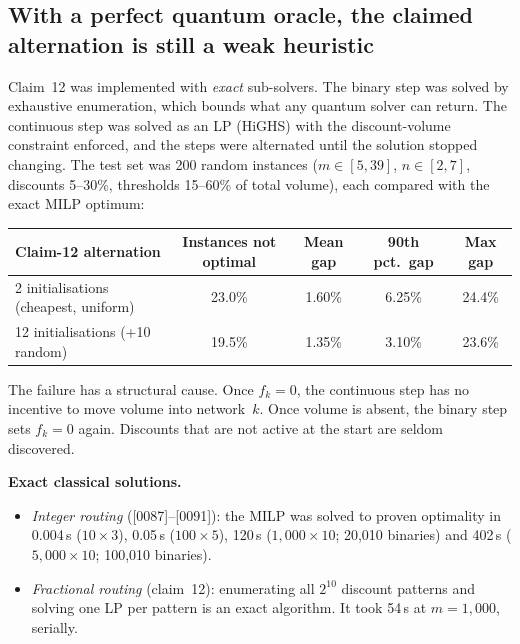 \documentclass[10pt,a4paper]{article}
\begin{document}
\subsection{With a perfect quantum oracle, the claimed alternation is still a weak heuristic}
Claim~12 was implemented with \emph{exact} sub-solvers. The binary step was solved by exhaustive enumeration, which bounds what any quantum solver can return. The continuous step was solved as an LP (HiGHS) with the discount-volume constraint enforced, and the steps were alternated until the solution stopped changing. The test set was 200 random instances ($m\in[5,39]$, $n\in[2,7]$, discounts 5--30\%, thresholds 15--60\% of total volume), each compared with the exact MILP optimum:
\begin{center}
\begin{tabular}{lcccc}
\toprule
Claim-12 alternation & Instances not optimal & Mean gap & 90th pct.\ gap & Max gap \\
\midrule
2 initialisations (cheapest, uniform) & 23.0\% & 1.60\% & 6.25\% & 24.4\% \\
12 initialisations (+10 random) & 19.5\% & 1.35\% & 3.10\% & 23.6\% \\
\bottomrule
\end{tabular}
\end{center}
The failure has a structural cause. Once $f_k=0$, the continuous step has no incentive to move volume into network~$k$. Once volume is absent, the binary step sets $f_k=0$ again. Discounts that are not active at the start are seldom discovered.

\noindent\textbf{Exact classical solutions.}
\begin{itemize}
  \item \emph{Integer routing} ([0087]--[0091]): the MILP was solved to proven optimality in 0.004\,s ($10\times3$), 0.05\,s ($100\times5$), 120\,s ($1{,}000\times10$; 20,010 binaries) and 402\,s ($5{,}000\times10$; 100,010 binaries).
  \item \emph{Fractional routing} (claim~12): enumerating all $2^{10}$ discount patterns and solving one LP per pattern is an exact algorithm. It took 54\,s at $m=1{,}000$, serially.
\end{itemize}
\end{document}
